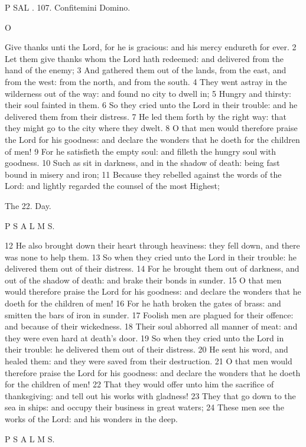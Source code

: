 P SAL . 107. Confitemini Domino.

O

Give thanks unti the Lord, for he is gracious: and his mercy endureth for ever. 2 Let them give thanks whom the Lord hath redeemed: and delivered from the hand of the enemy; 3 And gathered them out of the lands, from the east, and from the west: from the north, and from the south. 4 They went astray in the wilderness out of the way: and found no city to dwell in; 5 Hungry and thirsty: their soul fainted in them. 6 So they cried unto the Lord in their trouble: and he delivered them from their distress. 7 He led them forth by the right way: that they might go to the city where they dwelt. 8 O that men would therefore praise the Lord for his goodness: and declare the wonders that he doeth for the children of men! 9 For he satisfieth the empty soul: and filleth the hungry soul with goodness. 10 Such as sit in darkness, and in the shadow of death: being fast bound in misery and iron; 11 Because they rebelled against the words of the Lord: and lightly regarded the counsel of the most Highest;

The 22. Day.

P S A L M S.

12 He also brought down their heart through heaviness: they fell down, and there was none to help them. 13 So when they cried unto the Lord in their trouble: he delivered them out of their distress. 14 For he brought them out of darkness, and out of the shadow of death: and brake their bonds in sunder. 15 O that men would therefore praise the Lord for his goodness: and declare the wonders that he doeth for the children of men! 16 For he hath broken the gates of brass: and smitten the bars of iron in sunder. 17 Foolish men are plagued for their offence: and because of their wickedness. 18 Their soul abhorred all manner of meat: and they were even hard at death’s door. 19 So when they cried unto the Lord in their trouble: he delivered them out of their distress. 20 He sent his word, and healed them: and they were saved from their destruction. 21 O that men would therefore praise the Lord for his goodness: and declare the wonders that he doeth for the children of men! 22 That they would offer unto him the sacrifice of thanksgiving: and tell out his works with gladness! 23 They that go down to the sea in ships: and occupy their business in great waters; 24 These men see the works of the Lord: and his wonders in the deep.

P S A L M S.

